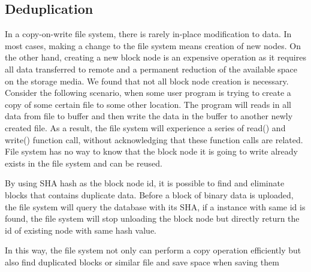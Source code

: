 \subsection{Deduplication}

    In a copy-on-write file system, there is rarely in-place modification to data. In most cases, making a change to the file system means creation of new nodes. On the other hand, creating a new block node is an expensive operation as it requires all data transferred to remote and a permanent reduction of the available space on the storage media.
We found that not all block node creation is necessary. Consider the following scenario, when some user program is trying to create a copy of some certain file to some other location. The program will reads in all data from file to buffer and then write the data in the buffer to another newly created file. As a result, the file system will experience a series of read() and write() function call, without acknowledging that these function calls are related. File system has no way to know that the block node it is going to write already exists in the file system and can be reused.

    By using SHA hash as the block node id, it is possible to find and eliminate blocks that contains duplicate data. Before a block of binary data is uploaded, the file system will query the database with its SHA, if a instance with same id is found, the file system will stop unloading the block node but directly return the id of existing node with same hash value.

    In this way, the file system not only can perform a copy operation efficiently but also find duplicated blocks or similar file and save space when saving them